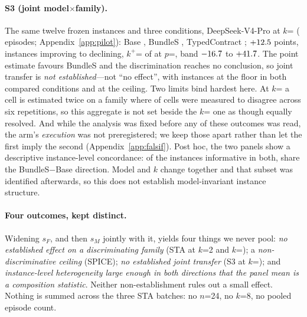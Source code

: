 \documentclass{article}
\begin{document}
\paragraph{S3 (joint model$\times$family).} The same twelve frozen instances and three conditions, DeepSeek-V4-Pro at $k$=\StatArmTwoK{} (\StatArmTwoEpisodes{} episodes; Appendix~\ref{app:pilot}): Base \StatArmTwoBase{}, BundleS \StatArmTwoBundleS{}, TypedContract \StatArmTwoTC{}; $+12.5$ points, \StatArmTwoImprove{} instances improving to \StatArmTwoDecline{} declining, $k^{+}$=\StatArmTwoSignPositive{} of \StatArmTwoSignNonzero{} at $p$=\StatArmTwoSignP{}, band $-16.7$ to $+41.7$. The point estimate favours BundleS and the discrimination reaches no conclusion, so joint transfer is \emph{not established}---not ``no effect'', with \StatArmTwoFloorN{} instances at the floor in both compared conditions and \StatArmTwoCeilingN{} at the ceiling. Two limits bind hardest here. At $k$=\StatArmTwoK{} a cell is estimated twice on a family where \StatEightAUnstableCells{} of \StatEightACells{} cells were measured to disagree across six repetitions, so this aggregate is not set beside the $k$=\StatEightAK{} one as though equally resolved. And while the analysis was fixed before any of these outcomes was read, the arm's \emph{execution} was not preregistered; we keep those apart rather than let the first imply the second (Appendix~\ref{app:falsif}). Post hoc, the two panels show a descriptive instance-level concordance: of the \StatXModelSignOf{} instances informative in both, \StatXModelSignAgree{} share the BundleS$-$Base direction. Model and $k$ change together and that subset was identified afterwards, so this does not establish model-invariant instance structure.

\paragraph{Four outcomes, kept distinct.} Widening $s_F$, and then $s_M$ jointly with it, yields four things we never pool: \emph{no established effect on a discriminating family} (STA at $k$=2 and $k$=\StatEightAK{}); a \emph{non-discriminative ceiling} (SPICE); \emph{no established joint transfer} (S3 at $k$=\StatArmTwoK{}); and \emph{instance-level heterogeneity large enough in both directions that the panel mean is a composition statistic}. Neither non-establishment rules out a small effect. Nothing is summed across the three STA batches: no $n$=24, no $k$=8, no pooled episode count.
\end{document}
